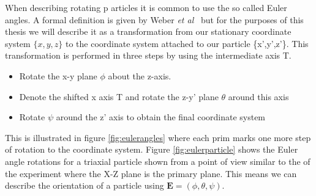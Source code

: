 When describing rotating p	articles it is common to use the so called Euler angles. A formal definition is given by Weber \emph{et al}~\cite{eulerAngles} but for the purposes of this thesis we will describe it as a transformation from our stationary coordinate system $\{x,y,z\}$ to the coordinate system attached to our particle \{x',y',z'\}. This transformation is performed in three steps by using the intermediate axis T.

\begin{itemize}
\item Rotate the x-y plane $\phi$ about the z-axis.
\item Denote the shifted x axis T and rotate the z-y' plane $\theta$ around this axis
\item Rotate $\psi$ around the z' axis to obtain the final coordinate system
\end{itemize}

This is illustrated in figure \ref{fig:eulerangles} where each prim marks one more step of rotation to the coordinate system. Figure \ref{fig:eulerparticle} shows the Euler angle rotations for a triaxial particle shown from a point of view similar to the of the experiment where the X-Z plane is the primary plane. This means we can describe the orientation of a particle using $\mathbf{E} = (\phi, \theta, \psi)$.


